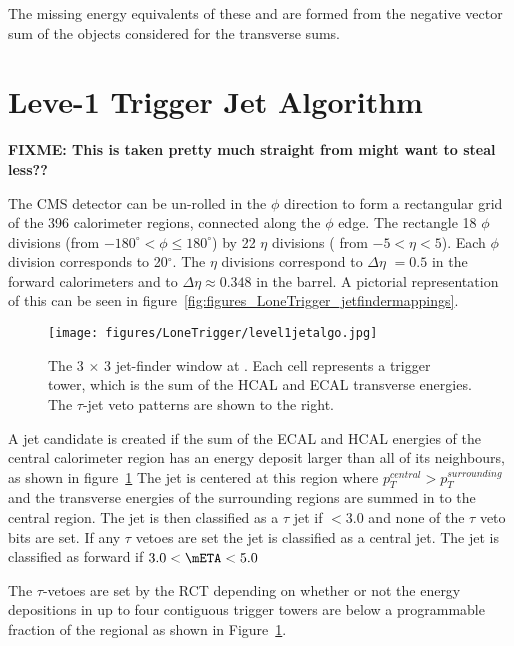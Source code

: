 The missing energy equivalents of these \MET and \MHT are formed from the 
negative vector sum of the objects considered for the
transverse sums.



\section{Leve-1 Trigger Jet Algorithm} %
\label{sec:leve_1_trigger_jet_algorithm}

\textbf{FIXME: This is taken pretty much straight from \cite{gctcomm} might 
want to steal less??} 

The CMS detector can be un-rolled in the $\phi$ direction to form a rectangular 
grid of the 396 calorimeter regions, connected along the $\phi$ edge. The
rectangle 18 $\phi$ divisions (from $-180^{\circ} < \phi \leq 180^{\circ}$) by 
22 $\eta$ divisions ( from $-5 < \eta < 5$). Each $\phi$ division corresponds 
to 20$^{\circ}$. The $\eta$ divisions correspond to $\Delta\eta$ $= 0.5$ in the 
forward calorimeters and to $\Delta\eta \approx 0.348$ in the barrel.
A pictorial representation of this can be seen in 
figure~\ref{fig:figures_LoneTrigger_jetfindermappings}.

\begin{figure}[ht]
  \centering
    \texttt{[image: figures/LoneTrigger/level1jetalgo.jpg]}
  \caption{The 3 $\times$ 3 jet-finder window at \Lone. Each cell represents a 
  trigger tower, which is the sum of the HCAL and ECAL transverse energies. The 
  $\tau$-jet veto patterns are shown to the right.}
  \label{fig:figures_LoneTrigger_level1jetalgo}
\end{figure}


A jet candidate is created if the sum of the ECAL and HCAL energies of the 
central calorimeter region has an energy deposit larger than all of its 
neighbours, as shown in figure~\ref{fig:figures_LoneTrigger_level1jetalgo}
The jet is centered at this region where $p_{T}^{central} > p_{T}^{surrounding}$
and the transverse energies of the surrounding regions are summed in to the 
central region. The jet is then classified as a $\tau$ jet if \mETA $< 3.0$ and 
none of the $\tau$ veto bits are set. If any $\tau$ vetoes are set the jet is 
classified as a central jet. The jet is classified as forward if $ 3.0 < \mETA 
< 5.0$

The $\tau$-vetoes are set by the RCT depending on whether or not the energy 
depositions in up to four contiguous trigger towers are below a programmable 
fraction of the regional \ET as shown in 
Figure~\ref{fig:figures_LoneTrigger_level1jetalgo}.

